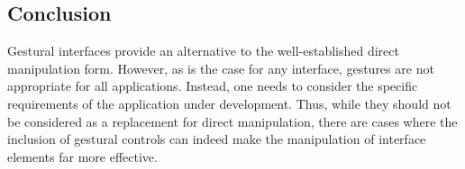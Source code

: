 \subsection{Conclusion}
Gestural interfaces provide an alternative to the well-established direct manipulation form. However, as is the case for any interface, gestures are not appropriate for all applications. Instead, one needs to consider the specific requirements of the application under development. Thus, while they should not be considered as a replacement for direct manipulation, there are cases where the inclusion of gestural controls can indeed make the manipulation of interface elements far more effective.

